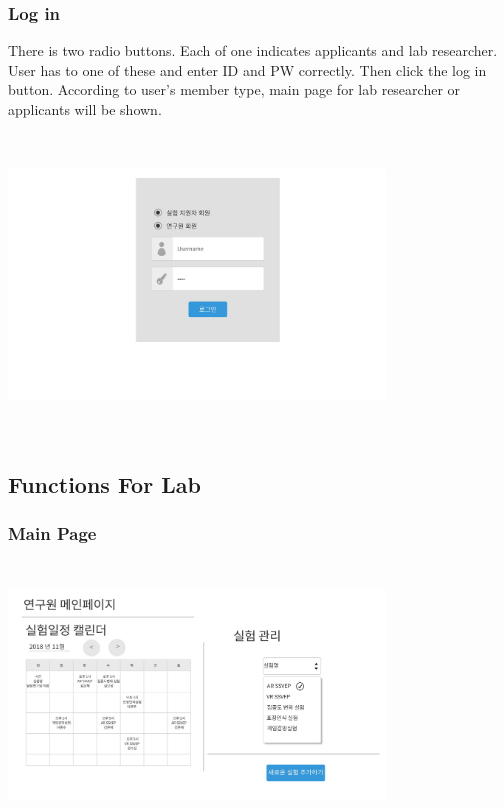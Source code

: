\documentclass[letterpaper, 10 pt, conference]{ieeeconf}  %
\begin{document}
\subsubsection{Log in}
There is two radio buttons. Each of one indicates applicants and lab researcher. User has to one of these and enter ID and PW correctly. Then click the log in button. According to user's member type, main page for lab researcher or applicants will be shown.\\
\includegraphics[width=10cm,height = 8cm]{Oven/02_signin}


\subsection{Functions For Lab}

\subsubsection{Main Page\\}

\includegraphics[width=10cm,height = 7cm]{Oven_ver2/ver2]06_labMainPage.jpg}
\end{document}
